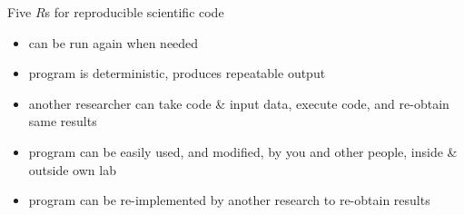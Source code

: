 \begin{frame}{Five $R$s for reproducible scientific code}

  \small
  
  \begin{itemize}[leftmargin=2.45cm]
    \itemsep9pt
    \item<1->[$\mathbf{R^1}$ \textit{Re-runnable}:] can be run again when needed 

    \item<1->[$\mathbf{R^2}$ \textit{Repeatable}:] program is deterministic, produces repeatable output 

    \item<1->[$\mathbf{R^3}$ \textit{Reproducible}:] another researcher can take code \& input data, execute code, and re-obtain same results \\ 

    \item<2->[$\mathbf{R^4}$ \textit{Reusable}:] program  can be easily used, and modified, by you and other people, inside \& outside own lab \\ 

    \item<4->[$\mathbf{R^5}$ \textit{Replicable}:] program can be re-implemented by another research to re-obtain results  \\ 

  \end{itemize}  

  
  
  
\end{frame}
